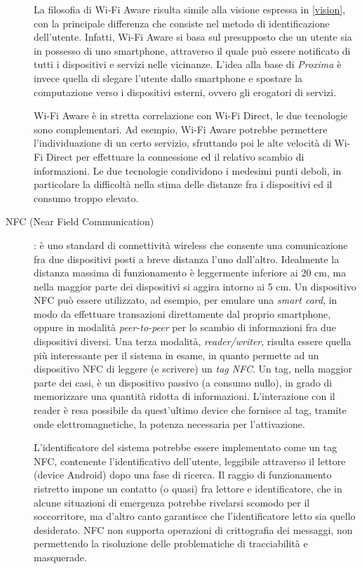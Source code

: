 \documentclass[a4paper,12pt]{report}
\begin{document}
\begin{description}
	La filosofia di Wi-Fi Aware risulta simile alla visione espressa in \autoref{vision}, con la principale differenza che consiste nel metodo di identificazione dell'utente. Infatti, Wi-Fi Aware si basa sul presupposto che un utente sia in possesso di uno smartphone, attraverso il quale può essere notificato di tutti i dispositivi e servizi nelle vicinanze. L'idea alla base di \emph{Proxima} è invece quella di slegare l'utente dallo smartphone e spostare la computazione verso i dispositivi esterni, ovvero gli erogatori di servizi. 
	
	Wi-Fi Aware è in stretta correlazione con Wi-Fi Direct, le due tecnologie sono complementari. Ad esempio, Wi-Fi Aware potrebbe permettere l'individuazione di un certo servizio, sfruttando poi le alte velocità di Wi-Fi Direct per effettuare la connessione ed il relativo scambio di informazioni. Le due tecnologie condividono i medesimi punti deboli, in particolare la difficoltà nella stima delle distanze fra i dispositivi ed il consumo troppo elevato.
	
	\item[NFC (Near Field Communication)] : è uno standard di connettività wireless che consente una comunicazione fra due dispositivi posti a breve distanza l'uno dall'altro. Idealmente la distanza massima di funzionamento è leggermente inferiore ai 20 cm, ma nella maggior parte dei dispositivi si aggira intorno ai 5 cm. Un dispositivo NFC può essere utilizzato, ad esempio, per emulare una \emph{smart card}, in modo da effettuare transazioni direttamente dal proprio smartphone, oppure in modalità \emph{peer-to-peer} per lo scambio di informazioni fra due dispositivi diversi. Una terza modalità, \emph{reader/writer}, risulta essere quella più interessante per il sistema in esame, in quanto permette ad un dispositivo NFC di leggere (e scrivere) un \emph{tag NFC}. Un tag, nella maggior parte dei casi, è un dispositivo passivo (a consumo nullo), in grado di memorizzare una quantità ridotta di informazioni. L'interazione con il reader è resa possibile da quest'ultimo device che fornisce al tag, tramite onde elettromagnetiche, la potenza necessaria per l'attivazione. 
	
	L'identificatore del sistema potrebbe essere implementato come un tag NFC, contenente l'identificativo dell'utente, leggibile attraverso il lettore (device Android) dopo una fase di ricerca. Il raggio di funzionamento ristretto impone un contatto (o quasi) fra lettore e identificatore, che in alcune situazioni di emergenza potrebbe rivelarsi scomodo per il soccorritore, ma d'altro canto garantisce che l'identificatore letto sia quello desiderato. NFC non supporta operazioni di crittografia dei messaggi, non permettendo la risoluzione delle problematiche di tracciabilità e masquerade.
	

\end{description}
\end{document}

